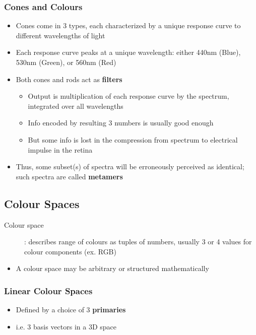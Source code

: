 \documentclass[letterpaper,12pt]{article}
\begin{document}
\subsubsection{Cones and Colours}
\begin{itemize}
 \item Cones come in 3 types, each characterized by a unique response curve to different wavelengths of light
 \item Each response curve peaks at a unique wavelength: either 440nm (Blue), 530nm (Green), or 560nm (Red)
 \item Both cones and rods act as \textbf{filters}
       \begin{itemize}
        \item Output is multiplication of each response curve by the spectrum, integrated over all wavelengths
        \item Info encoded by resulting 3 numbers is usually good enough
        \item But some info is lost in the compression from spectrum to electrical impulse in the retina
       \end{itemize}
 \item Thus, some subset(s) of spectra will be erroneously perceived as identical; such spectra are called \textbf{metamers}
\end{itemize}

\subsection{Colour Spaces}
\begin{description}
 \item[Colour space]: describes range of colours as tuples of numbers, usually 3 or 4 values for colour components (ex. RGB)
\end{description}
\begin{itemize}
 \item A colour space may be arbitrary or structured mathematically
\end{itemize}

\subsubsection{Linear Colour Spaces}
\begin{itemize}
 \item Defined by a choice of 3 \textbf{primaries}
 \item i.e. 3 basis vectors in a 3D space
\end{itemize}
\end{document}

